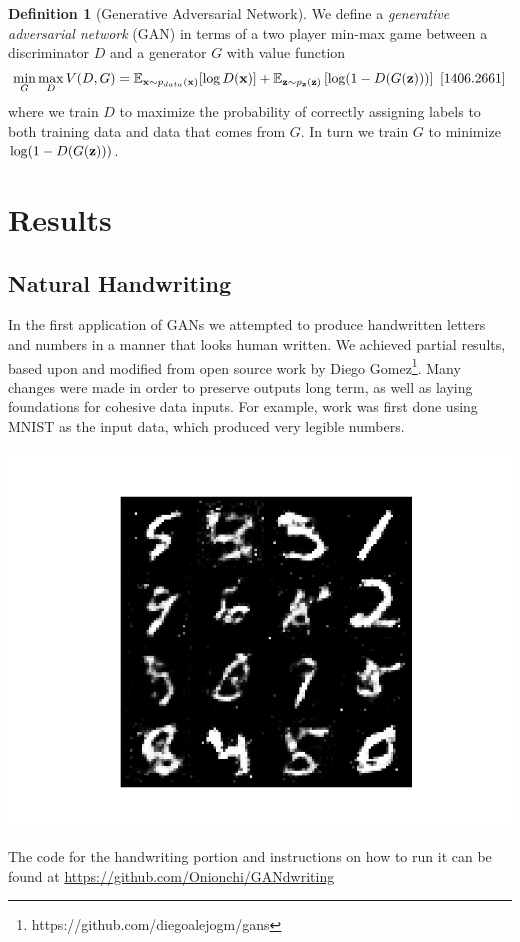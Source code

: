 \documentclass[12pt]{amsart}
\theoremstyle{definition}
\newtheorem{definition}[theorem]{Definition}
\theoremstyle{remark}
\begin{document}
\begin{definition}[Generative Adversarial Network]
        We define a {\em generative adversarial network} (GAN) in terms of a
        two player min-max game between a discriminator $D$ and a
        generator $G$ with value function
        \begin{align*}
                \min\limits_{G}\max\limits_{D}V(D,G) = \mathbb{E}_{{\bf x} \sim p_{data}({\bf x})}[\log D({\bf x})] + 
                \mathbb{E}_{{\bf z} \sim p_{{\bf z}}({\bf z}) } \left[ \log(1-D(G({\bf z}))) \right]\text{  \cite{1406.2661}}
        \end{align*}
        where we train $D$ to maximize the probability of correctly assigning
        labels to both training data and data that comes from $G$. In turn we train $G$
        to minimize $\log(1-D(G({\bf z})))$.
\end{definition}

\section{Results}
\subsection{Natural Handwriting}

In the first application of GANs we attempted to produce handwritten letters and
numbers in a manner that looks human written. We achieved partial results,
based upon and modified from open source work by Diego Gomez\footnote{https://github.com/diegoalejogm/gans}.
Many changes were made in order to preserve outputs long term, as well
as laying foundations for cohesive data inputs. For example, work was first
done using MNIST as the input data, which produced very legible numbers. \\
\begin{center}
    \includegraphics[scale=0.5]{output1.png} \\
\end{center}
The code for the handwriting portion and instructions on how to run it can be found at
\href{https://github.com/Onionchi/GANdwriting}{https://github.com/Onionchi/GANdwriting}
\end{document}
